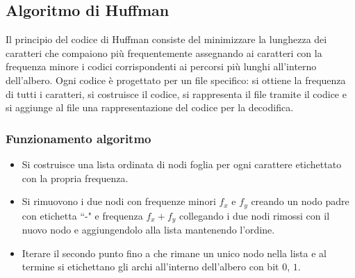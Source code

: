 \subsection{Algoritmo di Huffman}
Il principio del codice di Huffman consiste del minimizzare la lunghezza dei caratteri che compaiono pi\`u frequentemente assegnando ai caratteri con la frequenza minore i codici 
corrispondenti ai percorsi pi\`u lunghi all'interno dell'albero. Ogni codice \`e progettato per un file specifico: si ottiene la frequenza di tutti i caratteri, si costruisce il 
codice, si rappresenta il file tramite il codice e si aggiunge al file una rappresentazione del codice per la decodifica. 
\subsubsection{Funzionamento algoritmo}
\begin{itemize}
	\item Si costruisce una lista ordinata di nodi foglia per ogni carattere etichettato con la propria frequenza.
	\item Si rimuovono i due nodi con frequenze minori $f_x$ e $f_y$ creando un nodo padre con etichetta ``-" e frequenza $f_x+f_y$ collegando i due nodi rimossi con il nuovo nodo e
		aggiungendolo alla lista mantenendo l'ordine.
	\item Iterare il secondo punto fino a che rimane un unico nodo nella lista e al termine si etichettano gli archi all'interno dell'albero con bit $0$, $1$.
\end{itemize}
